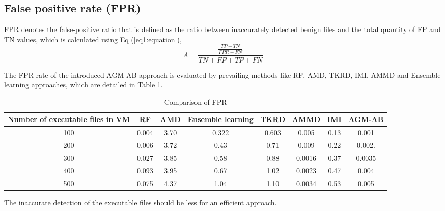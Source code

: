 \documentclass[acmtog]{acmart}
\begin{document}
\subsection{False positive rate (FPR)}
\par FPR denotes the false-positive ratio that is defined as the ratio between inaccurately detected benign files and the total quantity of FP and TN values, which is calculated using Eq (\ref{eq1:equation}),
\begin{equation}
A = \frac{\frac{TP+TN}{FPR+FN}}{TN+FP+TP+FN}
\label{eq1:equation}
\end{equation}
\par The FPR rate of the introduced AGM-AB approach is evaluated by prevailing methods like RF, AMD, TKRD, IMI, AMMD and Ensemble learning approaches, which are detailed in Table \ref{tab:freq2}.
\begin{table}
  \caption{Comparison of FPR}
  \label{tab:freq2}
  \begin{tabular}{cccccccc}
    \toprule
    Number of executable files in VM&RF&AMD&Ensemble learning&TKRD&AMMD&IMI&AGM-AB\\
    \midrule
       100& 0.004	&3.70	&0.322&	0.603&	0.005&	0.13&	0.001\\
    \midrule
       200&	0.006&	3.72	&0.43	&0.71&0.009	&0.22&	0.002.\\
    \midrule
        300&	0.027&	3.85&	0.58	&0.88	&0.0016&	0.37	&0.0035\\
    \midrule
       400&	0.093&	3.95&	0.67&	1.02&	0.0023&	0.47&	0.004\\
    \midrule
       500&	0.075&	4.37&	1.04&	1.10&	0.0034&	0.53&	0.005\\
  \bottomrule
\end{tabular}
\end{table}
The inaccurate detection of the executable files should be less for an efficient approach.
\end{document}

